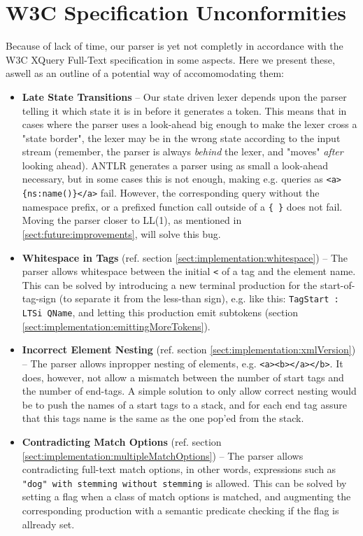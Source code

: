 \section{W3C Specification Unconformities}
\label{sect:future:knownBugs}
Because of lack of time, our parser is yet not completly in accordance with the W3C XQuery Full-Text specification in some aspects. Here we present these, aswell as an outline of a potential way of accomomodating them:

\begin{itemize}
\item \textbf{Late State Transitions} -- Our state driven lexer depends upon the parser telling it which state it is in before it generates a token. This means that in cases where the parser uses a look-ahead big enough to make the lexer cross a "state border", the lexer may be in the wrong state according to the input stream (remember, the parser is always \emph{behind} the lexer, and "moves" \emph{after} looking ahead). ANTLR generates a parser using as small a look-ahead necessary, but in some cases this is not enough, making e.g. queries as \verb!<a>{ns:name()}</a>! fail. However, the corresponding query without the namespace prefix, or a prefixed function call outside of a \verb!{ }! does not fail. Moving the parser closer to LL(1), as mentioned in \ref{sect:future:improvements}, will solve this bug.

\item \textbf{Whitespace in Tags} (ref. section \ref{sect:implementation:whitespace}) -- The parser allows whitespace between the initial \verb!<! of a tag and the element name. This can be solved by introducing a new terminal production for the start-of-tag-sign (to separate it from the less-than sign), e.g. like this: \verb!TagStart : LTSi QName!, and letting this production emit subtokens (section \ref{sect:implementation:emittingMoreTokens}).

\item \textbf{Incorrect Element Nesting} (ref. section \ref{sect:implementation:xmlVersion}) -- The parser allows inpropper nesting of elements, e.g. \verb!<a><b></a></b>!. It does, however, not allow a mismatch between the number of start tags and the number of end-tags. A simple solution to only allow correct nesting would be to push the names of a start tags to a stack, and for each end tag assure that this tags name is the same as the one pop'ed from the stack.

\item \textbf{Contradicting Match Options} (ref. section \ref{sect:implementation:multipleMatchOptions}) -- The parser allows contradicting full-text match options, in other words, expressions such as \verb!"dog" with stemming without stemming! is allowed. This can be solved by setting a flag when a class of match options is matched, and augmenting the corresponding production with a semantic predicate checking if the flag is allready set.

\end{itemize}

